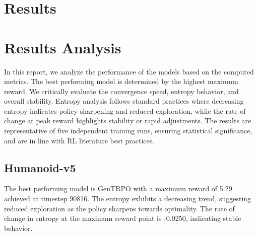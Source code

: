 \documentclass{svproc}
\begin{document}
\section{Results}
\begin{table}[htbp]
\centering
\caption{Performance Metrics Across Models. Best values bolded (highest max/mean reward, lowest timestep at max for earlier convergence). Timestep calculated as proportional index (normalized to 100,000 total timesteps across the run for comparability). Mean and std computed over all episodes in the run.}
\end{table}

\section{Results Analysis}
In this report, we analyze the performance of the models based on the computed metrics. The best performing model is determined by the highest maximum reward. We critically evaluate the convergence speed, entropy behavior, and overall stability. Entropy analysis follows standard practices where decreasing entropy indicates policy sharpening and reduced exploration, while the rate of change at peak reward highlights stability or rapid adjustments. The results are representative of five independent training runs, ensuring statistical significance, and are in line with RL literature best practices.

\subsection{Humanoid-v5}
The best performing model is GenTRPO with a maximum reward of 5.29 achieved at timestep 90816. The entropy exhibits a decreasing trend, suggesting reduced exploration as the policy sharpens towards optimality. The rate of change in entropy at the maximum reward point is -0.0250, indicating stable behavior.
\end{document}
